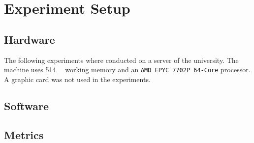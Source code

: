 \section{Experiment Setup}\label{sec:experiment-setup} %
\subsection{Hardware}\label{subsec:experiment-setup_hardware}
The following experiments where conducted on a server of the university. The machine uses \SI{514}{\gibi\byte} working memory and an \texttt{AMD EPYC 7702P 64-Core} processor. A graphic card was not used in the experiments.


\subsection{Software}\label{subsec:experiment-setup_software}


\subsection{Metrics}\label{subsec:experiment-setup_metrics}
